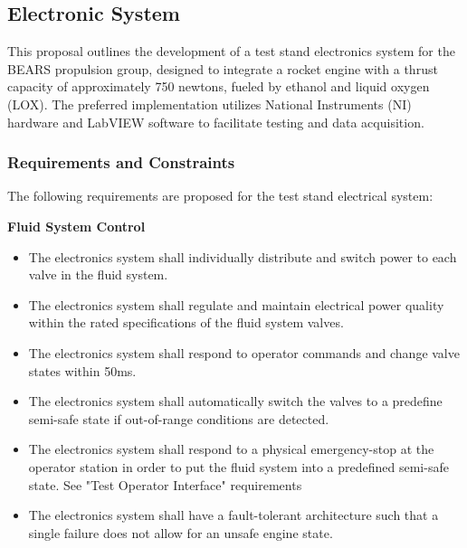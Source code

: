 \subsection{Electronic System}
This proposal outlines the development of a test stand electronics system for the BEARS propulsion group, designed to integrate a rocket engine with a thrust capacity of approximately 750 newtons, fueled by ethanol and liquid oxygen (LOX). The preferred implementation utilizes National Instruments (NI) hardware and LabVIEW software to facilitate testing and data acquisition. 
        
\subsubsection{Requirements and Constraints}

The following requirements are proposed for the test stand electrical system:

\textbf{Fluid System Control}
    \begin{itemize}
        \item The electronics system shall individually distribute and switch power to each valve in the fluid system.
        \item The electronics system shall regulate and maintain electrical power quality within the rated specifications of the fluid system valves.
        \item The electronics system shall respond to operator commands and change valve states within 50ms.
        \item The electronics system shall automatically switch the valves to a predefine semi-safe state if out-of-range conditions are detected.
        \item The electronics system shall respond to a physical emergency-stop at the operator station in order to put the fluid system into a predefined semi-safe state. See "Test Operator Interface" requirements
        \item The electronics system shall have a fault-tolerant architecture such that a single failure does not allow for an unsafe engine state.
    \end{itemize}

